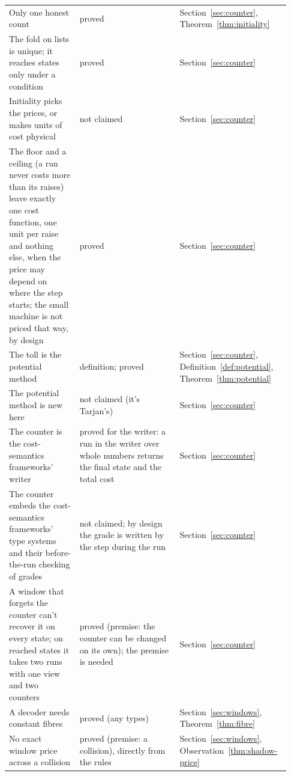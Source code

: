 \documentclass[11pt,twoside]{article}
\theoremstyle{thielethm}
\theoremstyle{thieledef}
\theoremstyle{thieledef}
\theoremstyle{thieledef}
\theoremstyle{thielethm}
\theoremstyle{thieleobs}
\theoremstyle{thielethm}
\begin{document}
\begin{longtable}{@{}>{\raggedright\arraybackslash}p{0.242\linewidth}>{\raggedright\arraybackslash}p{0.344\linewidth}>{\raggedright\arraybackslash}p{0.344\linewidth}@{}}
Only one honest count & proved  & Section~\ref{sec:counter}, Theorem~\ref{thm:initiality} \\
The fold on lists is unique; it reaches states only under a condition & proved  & Section~\ref{sec:counter} \\
Initiality picks the prices, or makes units of cost physical & not claimed & Section~\ref{sec:counter} \\
The floor and a ceiling (a run never costs more than its raises) leave exactly one cost function, one unit per raise and nothing else, when the price may depend on where the step starts; the small machine is not priced that way, by design & proved & Section~\ref{sec:counter} \\
The toll is the potential method & definition; proved & Section~\ref{sec:counter}, Definition~\ref{def:potential}, Theorem~\ref{thm:potential} \\
The potential method is new here & not claimed (it's Tarjan's) & Section~\ref{sec:counter} \\
The counter is the cost-semantics frameworks' writer & proved for the writer: a run in the writer over whole numbers returns the final state and the total cost & Section~\ref{sec:counter} \\
The counter embeds the cost-semantics frameworks' type systems and their before-the-run checking of grades & not claimed; by design the grade is written by the step during the run & Section~\ref{sec:counter} \\
A window that forgets the counter can't recover it on every state; on reached states it takes two runs with one view and two counters & proved (premise: the counter can be changed on its own); the premise is needed  & Section~\ref{sec:counter} \\
A decoder needs constant fibres & proved (any types) & Section~\ref{sec:windows}, Theorem~\ref{thm:fibre} \\
No exact window price across a collision & proved (premise: a collision), directly from the rules & Section~\ref{sec:windows}, Observation~\ref{thm:shadow-price} \\
\end{longtable}
\endgroup
\end{document}
